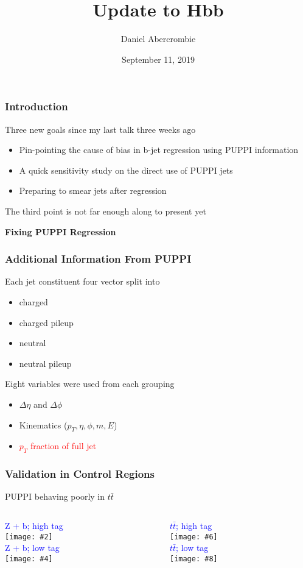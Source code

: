 \documentclass{beamer}
\author[D. Abercrombie]{
  Daniel Abercrombie
}
\title{\bf \sffamily Update to Hbb}
\date{September 11, 2019}
\newcommand{\fourfigs}[8]{
  \begin{columns}
    \begin{column}{0.3\linewidth}
      \centering
      \textcolor{blue}{#1} \\
      \texttt{[image: \#2]} \\
      \textcolor{blue}{#3} \\
      \texttt{[image: \#4]}
    \end{column}
    \begin{column}{0.3\linewidth}
      \centering
      \textcolor{blue}{#5} \\
      \texttt{[image: \#6]} \\
      \textcolor{blue}{#7} \\
      \texttt{[image: \#8]}
    \end{column}
  \end{columns}
}
\begin{document}
\begin{frame}
  \titlepage
\end{frame}


\begin{frame}
  \frametitle{Introduction}

  Three new goals since my last talk
  three weeks ago

  \begin{itemize}
  \item Pin-pointing the cause of bias in b-jet regression using PUPPI information
  \item A quick sensitivity study on the direct use of PUPPI jets
  \item Preparing to smear jets after regression
  \end{itemize}

  The third point is not far enough along to present yet

\end{frame}


\begin{frame}
  \centering
    {\Huge \bf\sffamily Fixing PUPPI Regression}
\end{frame}


\begin{frame}
  \frametitle{Additional Information From PUPPI}

  Each jet constituent four vector split into

  \begin{itemize}
  \item charged
  \item charged pileup
  \item neutral
  \item neutral pileup
  \end{itemize}

  Eight variables were used from each grouping 

  \begin{itemize}
  \item $\Delta \eta$ and $\Delta \phi$
  \item Kinematics ($p_T, \eta, \phi, m, E$)
  \item \textcolor{red}{$p_T$ fraction of full jet}
  \end{itemize}

\end{frame}


\begin{frame}
  \frametitle{Validation in Control Regions}

  PUPPI behaving poorly in $t\bar{t}$

  \fourfigs{Z + b; high tag}
           {../../190814/figs/190813_validation/heavyz_jet1_tf_190723_puppi_ptratio.pdf}
           {Z + b; low tag}
           {../../190814/figs/190813_validation/heavyz_jet2_tf_190723_puppi_ptratio.pdf}
           {$t\bar{t}$; high tag}
           {../../190814/figs/190813_validation/tt_jet1_tf_190723_puppi_ptratio.pdf}
           {$t\bar{t}$; low tag}
           {../../190814/figs/190813_validation/tt_jet2_tf_190723_puppi_ptratio.pdf}

\end{frame}
\end{document}
